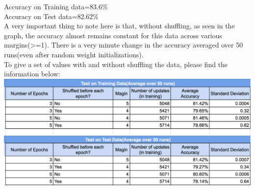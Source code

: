 \documentclass[12pt, fullpage,letterpaper]{article}
\begin{document}
 Accuracy on Training data=83.6\%\\
 Accuracy on Test data=82.62\%\\
 A very important thing to note here is that, without shuffling, as seen in the graph, the accuracy almost remains constant for this data across various margins(>=1). There is a very minute change in the accuracy averaged over 50 runs(even after random weight initializations).\\
 To give a set of values with and without shuffling the data, please find the information below:\\
  \includegraphics[scale=0.6]{334data.png}\\

 











 
\end{document}
